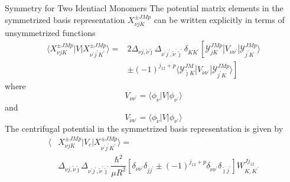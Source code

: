 \documentclass{beamer}
\begin{document}
	\begin{frame}{Symmetry for Two Identiacl Monomers}
		The potential matrix elements in the symmetrized basis representation $X^{\pm JMp}_{\nu jK}$ can be written explicitly in terms of unsymmetrized functions
		\begin{align}
			\langle X^{\pm JMp}_{\nu jK}|V|X^{\pm JMp}_{\nu^\prime j^\prime K^\prime}\rangle=&2\Delta_{\nu j,\tilde{\nu}\tilde{\jmath}}\Delta_{\nu^\prime j^\prime,\tilde{\nu}^\prime\tilde{\jmath}^\prime}\delta_{KK^\prime}\left[ \mathcal{Y}^{JMp}_{jK}|V_{\nu\nu^\prime}|\mathcal{Y}^{JMp}_{j^\prime K}\rangle\right.\nonumber\\
			&\left.\pm(-1)^{j_{12}+p}\langle\mathcal{Y}^{JM}_{\tilde{\jmath}K}|V_{\tilde{\nu}\nu^\prime}|\mathcal{Y}^{JMp}_{j^\prime K}\rangle\right] 
		\end{align}
		where
		\begin{equation}
			V_{\nu\nu^\prime}=\langle\phi_\nu|V|\phi_{\nu^\prime}\rangle
		\end{equation}
		and 
		\begin{equation}
			V_{\tilde{\nu}\nu^\prime}=\langle\phi_{\tilde{\nu}}|V|\phi_{\nu^\prime}\rangle
		\end{equation}
		The centrifugal potential in the symmetrized basis representation is given by
		\begin{align}
			\langle &X^{\pm JMp}_{\nu jK}|V_c|X^{\pm JMp}_{\nu^\prime j^\prime K^\prime}\rangle =\nonumber\\
			&\Delta_{\nu j,\tilde{\nu}\tilde{\jmath}}\Delta_{\nu^\prime j^\prime,\tilde{\nu}^\prime\tilde{\jmath}^\prime}\dfrac{\hbar^2}{\mu R^2}\left[ \delta_{\nu\nu^\prime}\delta_{jj^\prime}\pm(-1)^{j_{12}+p}\delta_{\tilde{\nu}\nu^\prime}\delta_{\tilde{\jmath}j^\prime}\right] W^{Jj_{12}}_{K,K^\prime}
		\end{align}
	\end{frame}
\end{document}

